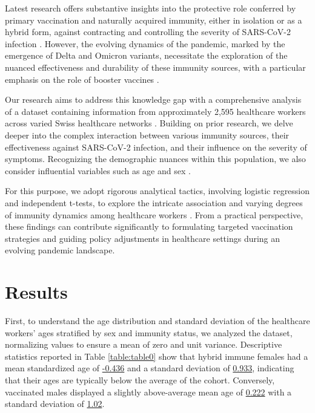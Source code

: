 \documentclass[11pt]{article}
\begin{document}
Latest research offers substantive insights into the protective role conferred by primary vaccination and naturally acquired immunity, either in isolation or as a hybrid form, against contracting and controlling the severity of SARS-CoV-2 infection \cite{Dan2021ImmunologicalMT, Goldberg2022ProtectionAW}. However, the evolving dynamics of the pandemic, marked by the emergence of Delta and Omicron variants, necessitate the exploration of the nuanced effectiveness and durability of these immunity sources, with a particular emphasis on the role of booster vaccines \cite{Harvey2021SARSCoV2VS, Choi2021SARSCoV2VO, Garca-Beltrn2021MultipleSV}.

Our research aims to address this knowledge gap with a comprehensive analysis of a dataset containing information from approximately 2,595 healthcare workers across varied Swiss healthcare networks \cite{Tella2020MentalHO, Suryawanshi2022LimitedCI}. Building on prior research, we delve deeper into the complex interaction between various immunity sources, their effectiveness against SARS-CoV-2 infection, and their influence on the severity of symptoms. Recognizing the demographic nuances within this population, we also consider influential variables such as age and sex \cite{Antonelli2021RiskFA}. 

For this purpose, we adopt rigorous analytical tactics, involving logistic regression and independent t-tests, to explore the intricate association and varying degrees of immunity dynamics among healthcare workers \cite{Ruan2020ClinicalPO, Pulliam2021IncreasedRO}. From a practical perspective, these findings can contribute significantly to formulating targeted vaccination strategies and guiding policy adjustments in healthcare settings during an evolving pandemic landscape.

\section*{Results}
First, to understand the age distribution and standard deviation of the healthcare workers' ages stratified by sex and immunity status, we analyzed the dataset, normalizing values to ensure a mean of zero and unit variance. Descriptive statistics reported in Table \ref{table:table0} show that hybrid immune females had a mean standardized age of \hyperlink{A0a}{-0.436} and a standard deviation of \hyperlink{A0b}{0.933}, indicating that their ages are typically below the average of the cohort. Conversely, vaccinated males displayed a slightly above-average mean age of \hyperlink{A3a}{0.222} with a standard deviation of \hyperlink{A3b}{1.02}.
\end{document}
